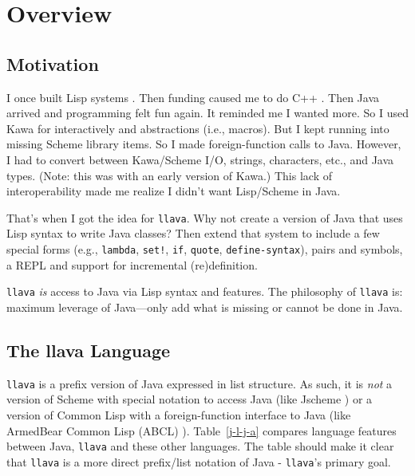 \documentclass{acm-final/sig-alternate-modified}
\begin{document}


\section{Overview}

\subsection{Motivation}

I once built Lisp systems \cite{LaSC5,LaSC3}.  Then funding caused me
to do C++ \cite{DC++}.  Then Java arrived and programming felt fun
again.  It reminded me I wanted more.  So I used Kawa \cite{kawa} for
interactively and abstractions (i.e., macros).  But I kept running
into missing Scheme library items.  So I made foreign-function calls
to Java.  However, I had to convert between Kawa/Scheme I/O, strings,
characters, etc., and Java types.  (Note: this was with an early
version of Kawa.)  This lack of interoperability made me realize I
didn't want Lisp/Scheme in Java.

That's when I got the idea for {\tt llava}.  Why not create a version
of Java that uses Lisp syntax to write Java classes?  Then extend that
system to include a few special forms (e.g., {\tt lambda}, {\tt set!},
{\tt if}, {\tt quote}, {\tt define-syntax}), pairs and symbols, a REPL
and support for incremental (re)definition.

{\tt llava} \emph{is} access to Java via Lisp syntax and features.
The philosophy of {\tt llava} is: maximum leverage of Java---only add
what is missing or cannot be done in Java.

\subsection{The llava Language}

{\tt llava} is a prefix version of Java expressed in list structure.
As such, it is \emph{not} a version of Scheme with special notation to
access Java (like Jscheme \cite{jscheme}) or a version of Common Lisp
with a foreign-function interface to Java (like ArmedBear Common Lisp
(ABCL) \cite{abcl}).  Table~\ref{j-l-j-a} compares language features
between Java, {\tt llava} and these other languages.  The table should
make it clear that {\tt llava} is a more direct prefix/list notation
of Java - {\tt llava}'s primary goal.
\end{document}
